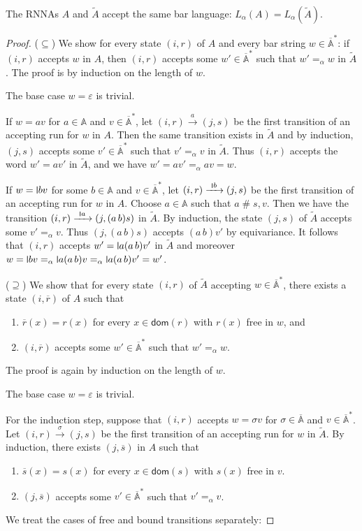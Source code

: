 \documentclass[final,a4paper,UKenglish,thm-restate,autoref,numberwithinsect]{lipics-v2021}
\newcommand{\midmid}{\hspace{0.2ex}{\rule[-0.1ex]{0.6pt}{1.65ex}}\hspace{0.2ex}}
\newcommand{\scriptmidmid}{\hspace{0.2ex}{\rule[-0.1ex]{0.6pt}{1.1ex}}\hspace{0.2ex}}
\newcommand{\newletter}[1]{{\midmid}#1}
\newcommand{\scriptnew}[1]{{\scriptmidmid}#1}
\newcommand{\barA}{\overline{\names}}
\numberwithin{equation}{section}
\newcommand{\ol}{\overline}
\newcommand{\xto}[1]{\xrightarrow{~#1~}}
\newcommand{\seq}{\subseteq}
\newcommand{\tl}{\widetilde}
\newcommand{\dom}{\mathsf{dom}}
\renewcommand{\epsilon}{\varepsilon}
\newcommand{\+}[1]{\mathcal{#1}\xspace}
\newcommand{\names}{\mathbb{A}}
\newcommand{\fresh}{\mathbin{\#}}
\theoremstyle{definition}
\begin{document}
%
\begin{lemma}\label{lem:ndc_lang}
  The RNNAs $A$ and $\tl A$ accept the same bar language: $L_\alpha(A)=L_\alpha(\tl{A})$.
\end{lemma}
%
\begin{proof}
  ($\seq$) We show for every state $(i,r)$ of $A$ and every bar string
  $w\in \barA^*$: if $(i,r)$ accepts $w$ in $A$, then $(i,r)$ accepts
  some $w'\in \barA^*$ such that $w'=_\alpha w$ in $\tl{A}$. The proof
  is by induction on the length of $w$.

  \smallskip\noindent The base case $w=\epsilon$ is trivial. 

  \smallskip\noindent If $w=av$ for $a\in \names$ and $v\in \barA^*$,
  let $(i,r)\xto{a} (j,s)$ be the first transition of an accepting run
  for $w$ in $A$. Then the same transition exists in $\tl{A}$ and by
  induction, $(j,s)$ accepts some $v'\in \barA^*$ such that
  $v'=_\alpha v$ in $\tl{A}$. Thus $(i,r)$ accepts the word $w'=av'$
  in $\tl{A}$, and we have $w'=av'=_\alpha av = w$.

  \smallskip\noindent If $w=\newletter bv$ for some $b\in \names$ and
  $v\in \barA^*$, let $(i,r)\xto{\scriptnew b} (j,s)$ be the first
  transition of an accepting run for $w$ in $A$. Choose $a\in \names$
  such that $a\fresh s,v$. Then we have the transition
  $(i,r)\xto{\scriptnew a} (j,(a\, b)s)$ in $\tl{A}$. By induction,
  the state $(j,s)$ of $\tl{A}$ accepts some $v'=_\alpha v$. Thus
  $(j, (a\, b) s)$ accepts $(a\,b)v'$ by equivariance. It follows that
  $(i,r)$ accepts $w'=\newletter a(a\, b)v'$ in $\tl{A}$ and moreover
  $w=\newletter bv =_\alpha \newletter a(a\, b)v =_\alpha \newletter
  a(a\, b) v'=w'$.

  \medskip\noindent($\supseteq$) We show that for every state $(i,r)$
  of $\tl{A}$ accepting $w\in \barA^*$, there exists a state
  $(i,\ol{r})$ of $A$ such that
  \begin{enumerate}
  \item\label{cond:1} $\ol{r}(x)=r(x)$ for every $x\in \dom(r)$ with $r(x)$ free in
    $w$, and
  \item\label{cond:2} $(i,\ol{r})$ accepts some $w'\in \barA^*$ such that $w'=_\alpha w$.
  \end{enumerate}
  The proof is again by induction on the length of $w$.

  \smallskip\noindent The base case $w=\epsilon$ is trivial.

  \smallskip\noindent For the induction step, suppose that $(i,r)$
  accepts $w=\sigma v$ for $\sigma \in \barA$ and $v\in \barA^*$. Let
  $(i,r)\xto{\sigma} (j,s)$ be the first transition of an accepting
  run for $w$ in $\tl{A}$. By induction, there exists $(j,\ol{s})$ in
  $A$ such that
  \begin{enumerate}%
  \item $\ol{s}(x)=s(x)$ for every $x\in \dom(s)$ with $s(x)$ free in $v$.
  \item $(j,\ol{s})$ accepts some $v'\in \barA^*$ such that $v'=_\alpha v$.
  \end{enumerate}
  We treat the cases of free and bound transitions separately:


\end{proof}
\end{document}

